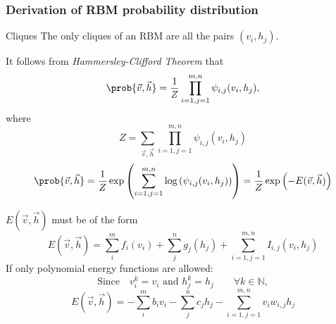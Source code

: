 
\begin{frame}[noframenumbering]
  \frametitle{Derivation of RBM probability distribution}
  \begin{alertblock}{Cliques}
    The only cliques of an RBM are all the pairs \((v_i,h_j)\).
  \end{alertblock}
  It follows from \emph{Hammersley-Clifford Theorem}\cite{fischer2012introduction} that 
  \[\prob{\vec{v}, \vec{h}} = \frac{1}{Z} \prod_{i=1,j=1}^{m,n} \psi_{i,j}(v_i, h_j),\]
  where
  \[Z = \sum_{\vec{v}, \vec{h}}\prod_{i=1,j=1}^{m,n} \psi_{i,j}(v_i, h_j)\]
  \pause
  \[
  \prob{\vec{v}, \vec{h}} 
  = \frac{1}{Z} \exp\left(\sum_{i=1,j=1}^{m,n}\log\left(\psi_{i,j}(v_i, h_j)\right)\right)
  = \frac{1}{Z} \exp\left(-E(\vec{v}, \vec{h})\right)
  \]
\end{frame}

\begin{frame}[noframenumbering]
  \(E(\vec{v}, \vec{h})\) must be of the form
  \[
  E(\vec{v}, \vec{h}) = \sum_{i}^m f_i{(v_i)} + \sum_{j}^n g_j{(h_j)} +
  \sum_{i=1,j=1}^{m,n} I_{i,j}{(v_i,h_j)}
  \]
  \pause
  If only polynomial energy functions are allowed:
  \[\text{Since}\quad v_i^k =  v_i \text{ and } h_j^k=h_j \qquad \forall k \in \mathds{N},\]
  \[
  E(\vec{v}, \vec{h}) = -\sum_{i}^m b_i v_i - \sum_{j}^n c_j h_j -
  \sum_{i=1,j=1}^{m,n} v_i w_{i,j} h_j
  \]
\end{frame}